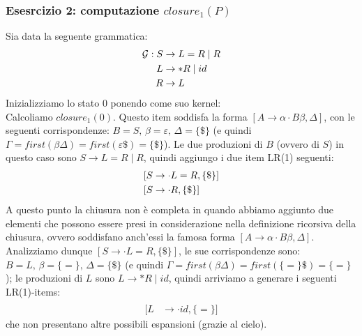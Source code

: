 \documentclass[class=book, crop=false, oneside, 12pt]{standalone}
\begin{document}
\subsubsection{Esesrcizio 2: computazione \(closure_1(P)\)}
\label{ex:closure-lr1}
Sia data la seguente grammatica:
\begin{align}
    \mathcal{G}: S &\to L=R \mid R \\
    L &\to *R \mid id \nonumber \\ \notag
    R &\to L \notag
\end{align}
Inizializziamo lo stato 0 ponendo come suo kernel:
\begin{equation*}
    [S' \to \cdot S, \{\$\}]
\end{equation*}
Calcoliamo \(closure_1(0)\). Questo item soddisfa la forma \([A \rightarrow \alpha \cdot B \beta, \Delta]\), con le seguenti corrispondenze: \(B = S \texttt{, } \beta = \varepsilon \texttt{, } \Delta = \{\$\}\) (e quindi \(\Gamma = first(\beta \Delta) = first(\varepsilon \$) = \{\$\}\)).
Le due produzioni di \(B\) (ovvero di \(S\)) in questo caso sono \(S \to L=R \mid R\), quindi aggiungo i due item LR(1) seguenti:
\begin{align}
    \label{prod:production-L}
    [S &\to \cdot L = R, \{\$\}] \\
    [S &\to \cdot R, \{\$\}] \notag
\end{align}
A questo punto la chiusura non è completa in quando abbiamo aggiunto due elementi che possono essere presi in considerazione nella definizione ricorsiva della chiusura, ovvero soddisfano anch'essi la famosa forma \([A \rightarrow \alpha \cdot B \beta, \Delta]\).
Analizziamo dunque \([S \to \cdot L = R, \{\$\}]\), le sue corrispondenze sono: \(B = L \texttt{, } \beta = \{=\} \texttt{, } \Delta = \{\$\}\) (e quindi \(\Gamma = first(\beta \Delta) = first(\{=\} \$) = \{=\}\)); le produzioni di \(L\) sono \(L \to *R \mid id\), quindi arriviamo a generare i seguenti LR(1)-items:
\begin{align*}
    [L &\to \cdot *R, \{=\}] \\
    [L &\to \cdot id, \{=\}]
\end{align*}
che non presentano altre possibili espansioni (grazie al cielo).
\end{document}

